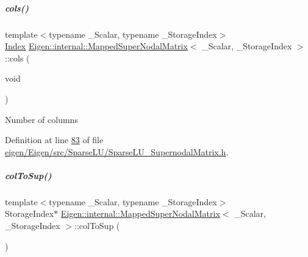 \mbox{\label{group___sparse_l_u___module_a57b3811f03be2d94c0cdd105aba1b932}} 
\subparagraph{\texorpdfstring{cols()}{cols()}\hspace{0.1cm}{\footnotesize\ttfamily [2/2]}}
{\footnotesize\ttfamily template$<$typename \+\_\+\+Scalar, typename \+\_\+\+Storage\+Index$>$ \\
\hyperlink{namespace_eigen_a62e77e0933482dafde8fe197d9a2cfde}{Index} \hyperlink{group___sparse_l_u___module_class_eigen_1_1internal_1_1_mapped_super_nodal_matrix}{Eigen\+::internal\+::\+Mapped\+Super\+Nodal\+Matrix}$<$ \+\_\+\+Scalar, \+\_\+\+Storage\+Index $>$\+::cols (\begin{DoxyParamCaption}\item[{void}]{ }\end{DoxyParamCaption})\hspace{0.3cm}{\ttfamily [inline]}}

Number of columns 

Definition at line \hyperlink{eigen_2_eigen_2src_2_sparse_l_u_2_sparse_l_u___supernodal_matrix_8h_source_l00083}{83} of file \hyperlink{eigen_2_eigen_2src_2_sparse_l_u_2_sparse_l_u___supernodal_matrix_8h_source}{eigen/\+Eigen/src/\+Sparse\+L\+U/\+Sparse\+L\+U\+\_\+\+Supernodal\+Matrix.\+h}.

\mbox{\label{group___sparse_l_u___module_a1e2c012b63809715188aa7f0c722868d}} 
\subparagraph{\texorpdfstring{col\+To\+Sup()}{colToSup()}\hspace{0.1cm}{\footnotesize\ttfamily [1/2]}}
{\footnotesize\ttfamily template$<$typename \+\_\+\+Scalar, typename \+\_\+\+Storage\+Index$>$ \\
Storage\+Index$\ast$ \hyperlink{group___sparse_l_u___module_class_eigen_1_1internal_1_1_mapped_super_nodal_matrix}{Eigen\+::internal\+::\+Mapped\+Super\+Nodal\+Matrix}$<$ \+\_\+\+Scalar, \+\_\+\+Storage\+Index $>$\+::col\+To\+Sup (\begin{DoxyParamCaption}{ }\end{DoxyParamCaption})\hspace{0.3cm}{\ttfamily [inline]}}

